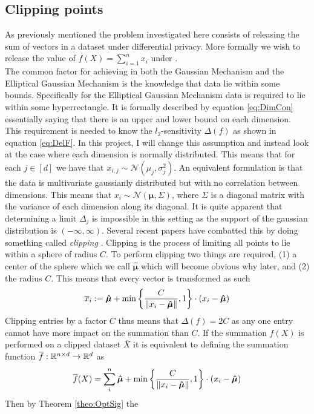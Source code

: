 \documentclass[a4paper,12pt]{article}
\begin{document}
\subsection{Clipping points}
\label{seq:problem}
As previously mentioned the problem investigated here consists of releasing the sum of vectors 
in a dataset under differential privacy.
More formally we wish to release the value of 
$ f(X) = \sum_{i = 1}^n x_i  $
under \edp. \\
The common factor for achieving \edp in both the Gaussian Mechanism
and the Elliptical Gaussian Mechanism is the knowledge that data lie within some bounds.
Specifically for the Elliptical Gaussian Mechanism data is required to lie within some hyperrectangle.
It is formally described by equation \eqref{eq:DimCon} 
essentially saying that there is an upper and lower bound on each dimension.
This requirement is needed to know the $l_2$-sensitivity $ \Delta(f) $ as shown in equation \eqref{eq:DelF}.
In this project, I will change this assumption and instead 
look at the case where each dimension is normally distributed.
This means that for each 
$ j \in [d] $ we have that 
$x_{i,j} \sim \mathcal{N}(\mu_j, \sigma_j^2)$.
An equivalent formulation is that the data is 
multivariate gaussianly distributed but with no correlation between dimensions.
This means that $x_i \sim \mathcal{N}(\bm{\mu}, \Sigma ) $, 
where $\Sigma$ is a diagonal matrix with the variance of each 
dimension along its diagonal.
It is quite apparent that determining a limit $ \Delta_j $ is impossible 
in this setting as the support of the gaussian distribution is $ (-\infty, \infty)$.
Several recent papers have combatted this by doing something called 
\textit{clipping} \cite{Huang2021,coinpress}. 
Clipping is the process of limiting all points to lie within a sphere of radius $C$.
To perform clipping two things are required, (1) a center of the sphere which we call $\bm{\hat{\mu}}$
which will become obvious why later, and (2) the radius $C$.
This means that every vector is transformed as such
\[
    \overline{x}_i := \bm{\hat{\mu}} + \min \left \{\frac{C}{\| x_i - \bm{\hat{\mu}} \|}, 1\right\} \cdot (x_i - \bm{\hat{\mu}})
\]
Clipping entries by a factor $C$ thus means that $ \Delta(f) = 2C $ 
as any one entry cannot have more impact on the summation than $C$.
If the summation $f(X)$ is 
performed on a clipped dataset $\overline{X}$ it is equivalent to
defining the summation function $\overline{f}: \mathbb{R}^{n \times d} \rightarrow \mathbb{R}^d$ as
\[
    \overline{f}(X) = \sum_i^n \bm{\hat{\mu}} + \min \left \{ \frac{C}{\| x_i - \bm{\hat{\mu}} \|}, 1\right\} \cdot (x_i - \bm{\hat{\mu}})
\]
Then by Theorem \ref{theo:OptSig} the 
\end{document}
